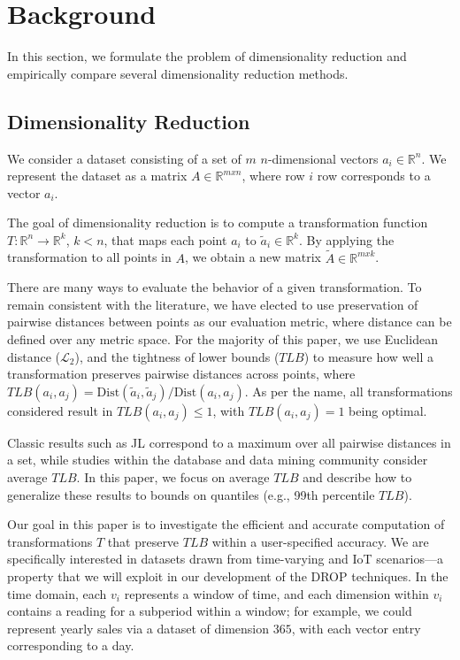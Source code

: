 \section{Background}
\label{sec:bakeoff}

In this section, we formulate the problem of dimensionality reduction and empirically compare several dimensionality reduction methods.

\subsection{Dimensionality Reduction}

We consider a dataset consisting of a set of $m$ $n$-dimensional vectors $a_i \in \mathbb{R}^n$. We represent the dataset as a matrix $A \in \mathbb{R}^{mxn}$, where row $i$  row corresponds to a vector $a_i$.

The goal of dimensionality reduction is to compute a transformation function $T: \mathbb{R}^n \rightarrow \mathbb{R}^k$, $k < n$, that maps each point $a_i$ to $\tilde{a}_i \in \mathbb{R}^k$.
By applying the transformation to all points in $A$, we obtain a new matrix $\tilde{A} \in \mathbb{R}^{mxk}$.

There are many ways to evaluate the behavior of a given transformation.
To remain consistent with the literature, we have elected to use preservation of pairwise distances between points as our evaluation metric, where distance can be defined over any metric space.
For the majority of this paper, we use Euclidean distance ($\mathcal{L}_2$), and the tightness of lower bounds ($TLB$) to measure how well a transformation preserves pairwise distances across points, where $TLB(a_i,a_j) = \text{Dist}(\tilde{a}_i, \tilde{a}_j)/\text{Dist}(a_i, a_j)$. As per the name, all transformations considered result in $TLB(a_i,a_j) \leq 1$, with $TLB(a_i,a_j) = 1$ being optimal. 

Classic results such as JL correspond to a maximum over all pairwise distances in a set, while studies within the database and data mining community consider average $TLB$.
In this paper, we focus on average $TLB$ and describe how to generalize these results to bounds on quantiles (e.g., 99th percentile $TLB$).

Our goal in this paper is to investigate the efficient and accurate computation of transformations $T$ that preserve $TLB$ within a user-specified accuracy.
We are specifically interested in datasets drawn from time-varying and IoT scenarios---a property that we will exploit in our development of the DROP techniques.
In the time domain, each $v_i$ represents a window of time, and each dimension within $v_i$ contains a reading for a subperiod within a window; for example, we could represent yearly sales via a dataset of dimension $365$, with each vector entry corresponding to a day.

